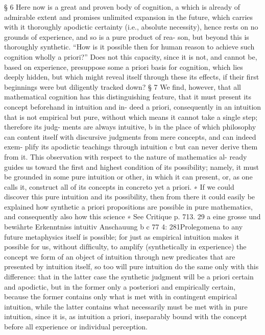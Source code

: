 § 6
Here now is a great and proven body of cognition, a which is already of
admirable extent and promises unlimited expansion in the future, which
carries with it thoroughly apodictic certainty (i.e., absolute necessity),
hence rests on no grounds of experience, and so is a pure product of rea-
son, but beyond this is thoroughly synthetic. “How is it possible then for
human reason to achieve such cognition wholly a priori?” Does not this
capacity, since it is not, and cannot be, based on experience, presuppose
some a priori basis for cognition, which lies deeply hidden, but which
might reveal itself through these its effects, if their ﬁrst beginnings were
but diligently tracked down?
§ 7
We ﬁnd, however, that all mathematical cognition has this distinguishing
feature, that it must present its concept beforehand in intuition and in-
deed a priori, consequently in an intuition that is not empirical but pure,
without which means it cannot take a single step; therefore its judg-
ments are always intuitive, b in the place of which philosophy can content
itself with discursive judgments from mere concepts, and can indeed exem-
plify its apodictic teachings through intuition c but can never derive them
from it. This observation with respect to the nature of mathematics al-
ready guides us toward the ﬁrst and highest condition of its possibility;
namely, it must be grounded in some pure intuition or other, in which it
can present, or, as one calls it, construct all of its concepts in concreto yet
a priori. ∗ If we could discover this pure intuition and its possibility, then
from there it could easily be explained how synthetic a priori propositions
are possible in pure mathematics, and consequently also how this science
∗ See Critique p. 713. 29
a eine grosse und bewährte Erkenntniss
intuitiv
Anschauung
b
c
77
4: 281Prolegomena to any future metaphysics
itself is possible; for just as empirical intuition makes it possible for us,
without difﬁculty, to amplify (synthetically in experience) the concept we
form of an object of intuition through new predicates that are presented
by intuition itself, so too will pure intuition do the same only with this
difference: that in the latter case the synthetic judgment will be a priori
certain and apodictic, but in the former only a posteriori and empirically
certain, because the former contains only what is met with in contingent
empirical intuition, while the latter contains what necessarily must be
met with in pure intuition, since it is, as intuition a priori, inseparably
bound with the concept before all experience or individual perception.
